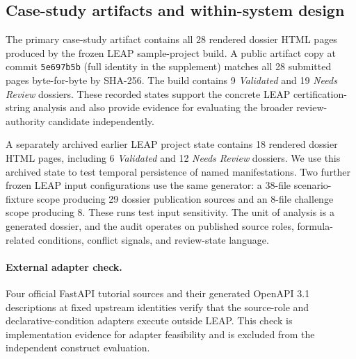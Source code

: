 \documentclass[a4paper,fleqn]{cas-dc}
\begin{document}
\subsection{Case-study artifacts and within-system design}
\label{sec:artifacts}
The primary case-study artifact contains all 28 rendered dossier HTML pages produced by the frozen LEAP sample-project build. A public artifact copy at commit \texttt{5e697b5b} (full identity in the supplement) matches all 28 submitted pages byte-for-byte by SHA-256. The build contains 9 \emph{Validated} and 19 \emph{Needs Review} dossiers. These recorded states support the concrete LEAP certification-string analysis and also provide evidence for evaluating the broader review-authority candidate independently.

A separately archived earlier LEAP project state contains 18 rendered dossier HTML pages, including 6 \emph{Validated} and 12 \emph{Needs Review} dossiers. We use this archived state to test temporal persistence of named manifestations. Two further frozen LEAP input configurations use the same generator: a 38-file scenario-fixture scope producing 29 dossier publication sources and an 8-file challenge scope producing 8. These runs test input sensitivity. The unit of analysis is a generated dossier, and the audit operates on published source roles, formula-related conditions, conflict signals, and review-state language.

\paragraph{External adapter check.} Four official FastAPI tutorial sources and their generated OpenAPI 3.1 descriptions at fixed upstream identities \citep{FastAPI2026,OpenAPI31} verify that the source-role and declarative-condition adapters execute outside LEAP. This check is implementation evidence for adapter feasibility and is excluded from the independent construct evaluation.
\end{document}
